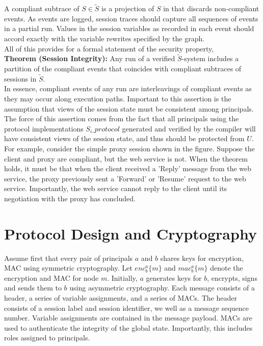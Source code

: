 \documentclass[a4paper,10pt]{article}
\begin{document}
A compliant subtrace of $S \in \tilde{S}$ is a projection of $S$ in that discards non-compliant events.
As events are logged, session traces should capture all sequences of events in a partial run.  Values
in the session variables as recorded in each event should accord exactly with the variable rewrites
specified by the graph.\\

All of this provides for a formal statement of the security property,\\

\textbf{Theorem (Session Integrity):} Any run of a verified $\tilde{S}$-system includes a partition
of the compliant events that coincides with compliant subtraces of sessions in $\tilde{S}$.\\

In essence, compliant events of any run are interleavings of compliant events as they may occur along
execution paths.  Important to this assertion is the assumption that views of the session state must
be consistent among principals.  The force of this assertion comes from the fact that all principals
using the protocol implementations $S_i\_protocol$ generated and verified by the compiler will
have consistent views of the session state, and thus should be protected from $U$.\\

For example, consider the simple proxy session shown in the figure.  Suppose the client and proxy are
compliant, but the web service is not.  When the theorem holds, it must be that when the client
received a 'Reply' message from the web service, the proxy previously sent a 'Forward' or 'Resume'
request to the web service.  Importantly, the web service cannot reply to the client until its
negotiation with the proxy has concluded.\\

\section{Protocol Design and Cryptography}

Assume first that every pair of principals $a$ and $b$ shares keys for encryption, MAC using
symmetric cryptography.  Let $enc_b^a\{m\}$ and $mac_b^a\{m\}$ denote the encryption and MAC for
node $m$.  Initially, $a$ generates keys for $b$, encrypts, signs and sends them to $b$ using
asymmetric cryptography.  Each message consists of a header, a series of variable assignments,
and a series of MACs.  The header consists of a session label and session identifier, we well
as a message sequence number.  Variable assignments are contained in the message payload.  MACs
are used to authenticate the integrity of the global state.  Importantly, this includes roles
assigned to principals.\\
\end{document}
